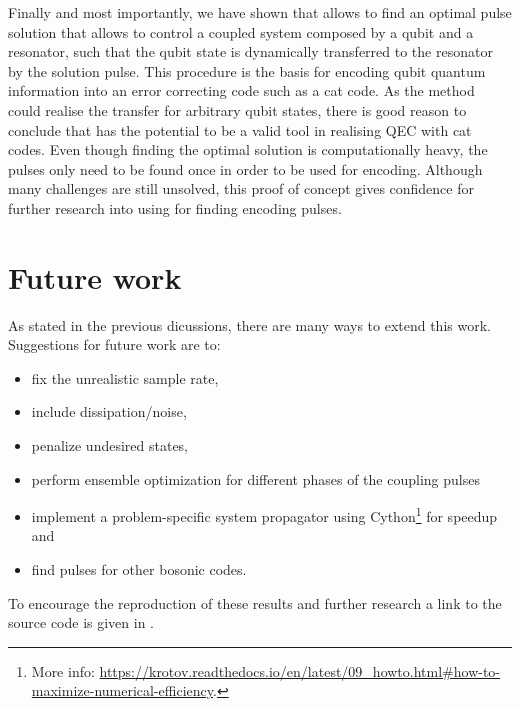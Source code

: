 \documentclass[main.tex]{subfiles}
\begin{document}
Finally and most importantly, we have shown that \krotov{} allows to find an optimal pulse solution that allows to control a coupled system composed by a qubit and a resonator, such that the qubit state is dynamically transferred to the resonator by the solution pulse.
This procedure is the basis for encoding qubit quantum information into an error correcting code such as a cat code.
As the method could realise the transfer for arbitrary qubit states, there is good reason to conclude that \krotov{} has the potential to be a valid tool in realising QEC with cat codes.
Even though finding the optimal solution is computationally heavy, the pulses only need to be found once in order to be used for encoding.
Although many challenges are still unsolved, this proof of concept gives confidence for further research into using \krotov{} for finding encoding pulses.

\section{Future work}%
\label{sec:future-work}
As stated in the previous dicussions, there are many ways to extend this work.
Suggestions for future work are to:
\begin{itemize}
    \item fix the unrealistic sample rate,
    \item include dissipation/noise,
    \item penalize undesired states,
    \item perform ensemble optimization for different phases of the coupling pulses
    \item implement a problem-specific system propagator using Cython\footnote{More info: \url{https://krotov.readthedocs.io/en/latest/09_howto.html\#how-to-maximize-numerical-efficiency}.} for speedup and
    \item find pulses for other bosonic codes.
\end{itemize}
To encourage the reproduction of these results and further research a link to the source code is given in .
\end{document}
